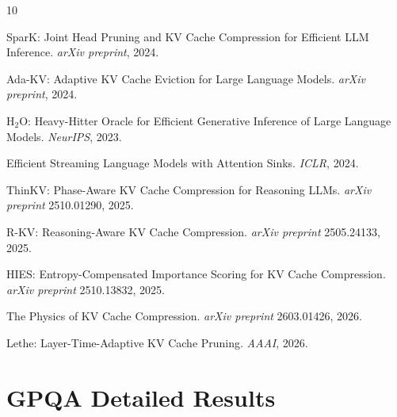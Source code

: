 \documentclass[11pt,a4paper]{article}
\begin{document}
\begin{thebibliography}{10}

SparK: Joint Head Pruning and KV Cache Compression for Efficient LLM Inference. \textit{arXiv preprint}, 2024.

Ada-KV: Adaptive KV Cache Eviction for Large Language Models. \textit{arXiv preprint}, 2024.

H$_2$O: Heavy-Hitter Oracle for Efficient Generative Inference of Large Language Models. \textit{NeurIPS}, 2023.

Efficient Streaming Language Models with Attention Sinks. \textit{ICLR}, 2024.

ThinKV: Phase-Aware KV Cache Compression for Reasoning LLMs. \textit{arXiv preprint} 2510.01290, 2025.

R-KV: Reasoning-Aware KV Cache Compression. \textit{arXiv preprint} 2505.24133, 2025.

HIES: Entropy-Compensated Importance Scoring for KV Cache Compression. \textit{arXiv preprint} 2510.13832, 2025.

The Physics of KV Cache Compression. \textit{arXiv preprint} 2603.01426, 2026.

Lethe: Layer-Time-Adaptive KV Cache Pruning. \textit{AAAI}, 2026.

\end{thebibliography}

\appendix

\section{GPQA Detailed Results}
\label{app:gpqa}
\end{document}
